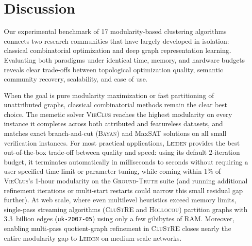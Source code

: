 \documentclass[11pt,a4paper]{article}
\begin{document}
\section{Discussion}\label{sec:discussion}\label{sec:conclusion}
Our experimental benchmark of 17 modularity-based clustering algorithms connects two research communities that have largely developed in isolation: classical combinatorial optimization and deep graph representation learning. Evaluating both paradigms under identical time, memory, and hardware budgets reveals clear trade-offs between topological optimization quality, semantic community recovery, scalability, and ease of use.

When the goal is pure modularity maximization or fast partitioning of unattributed graphs, classical combinatorial methods remain the clear best choice. The memetic solver \textsc{VieClus} reaches the highest modularity on every instance it completes across both attributed and featureless datasets, and matches exact branch-and-cut (\textsc{Bayan}) and MaxSAT solutions on all small verification instances. For most practical applications, \textsc{Leiden} provides the best out-of-the-box trade-off between quality and speed: using its default 2-iteration budget, it terminates automatically in milliseconds to seconds without requiring a user-specified time limit or parameter tuning, while coming within $1\%$ of \textsc{VieClus}'s 1-hour modularity on the \textsc{Ground-Truth} suite (and running additional refinement iterations or multi-start restarts could narrow this small residual gap further). At web scale, where even multilevel heuristics exceed memory limits, single-pass streaming algorithms (\textsc{CluStRE} and \textsc{Hollocou}) partition graphs with $3.3$~billion edges (\texttt{uk-2007-05}) using only a few gibibytes of RAM. Moreover, enabling multi-pass quotient-graph refinement in \textsc{CluStRE} closes nearly the entire modularity gap to \textsc{Leiden} on medium-scale networks.
\end{document}

